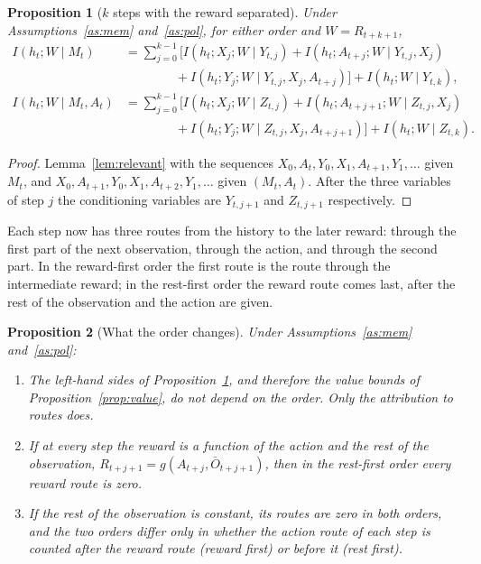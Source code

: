 \documentclass{article}
\newtheorem{proposition}{Proposition}
\theoremstyle{definition}
\theoremstyle{remark}
\newcommand{\Ob}{\bar O}
\begin{document}
\begin{proposition}[$k$ steps with the reward separated]\label{prop:k-steps-order}
Under Assumptions~\ref{as:mem} and~\ref{as:pol}, for either order and $W=R_{t+k+1}$,
\begin{align*}
I(h_t;W\mid M_t)&=\sum_{j=0}^{k-1}\Big[I(h_t;X_j;W\mid Y_{t,j})+I(h_t;A_{t+j};W\mid Y_{t,j},X_j)\\
&\qquad\qquad+I(h_t;Y_j;W\mid Y_{t,j},X_j,A_{t+j})\Big]+I(h_t;W\mid Y_{t,k}),\\
I(h_t;W\mid M_t,A_t)&=\sum_{j=0}^{k-1}\Big[I(h_t;X_j;W\mid Z_{t,j})+I(h_t;A_{t+j+1};W\mid Z_{t,j},X_j)\\
&\qquad\qquad+I(h_t;Y_j;W\mid Z_{t,j},X_j,A_{t+j+1})\Big]+I(h_t;W\mid Z_{t,k}).
\end{align*}
\end{proposition}

\begin{proof}
Lemma~\ref{lem:relevant} with the sequences $X_0,A_t,Y_0,X_1,A_{t+1},Y_1,\dots$ given $M_t$, and $X_0,A_{t+1},Y_0,X_1,A_{t+2},Y_1,\dots$ given $(M_t,A_t)$. After the three variables of step $j$ the conditioning variables are $Y_{t,j+1}$ and $Z_{t,j+1}$ respectively.
\end{proof}

Each step now has three routes from the history to the later reward: through the first part of the next observation, through the action, and through the second part. In the reward-first order the first route is the route through the intermediate reward; in the rest-first order the reward route comes last, after the rest of the observation and the action are given.

\begin{proposition}[What the order changes]\label{prop:order-many}
Under Assumptions~\ref{as:mem} and~\ref{as:pol}:
\begin{enumerate}
\item[(a)] The left-hand sides of Proposition~\ref{prop:k-steps-order}, and therefore the value bounds of Proposition~\ref{prop:value}, do not depend on the order. Only the attribution to routes does.
\item[(b)] If at every step the reward is a function of the action and the rest of the observation, $R_{t+j+1}=g(A_{t+j},\Ob_{t+j+1})$, then in the rest-first order every reward route is zero.
\item[(c)] If the rest of the observation is constant, its routes are zero in both orders, and the two orders differ only in whether the action route of each step is counted after the reward route (reward first) or before it (rest first).
\end{enumerate}
\end{proposition}
\end{document}
